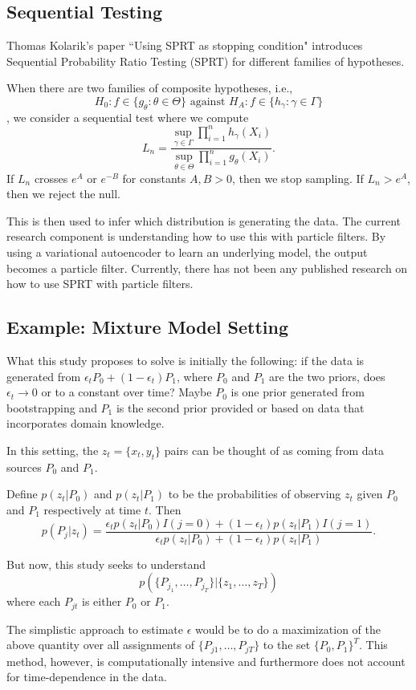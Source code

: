 \documentclass[english]{article}
\numberwithin{equation}{section}
\begin{document}
	\subsection*{Sequential Testing}
	Thomas Kolarik's paper ``Using SPRT as stopping condition" 
	\cite{url} introduces Sequential Probability Ratio Testing (SPRT) for different families of hypotheses.
	
	When there are two families of composite hypotheses, i.e.,
	$$H_0: f\in \{g_{\theta}:\theta\in \Theta\} \textrm{ against } H_A:f\in \{h_{\gamma}:\gamma\in \Gamma\}$$, we consider a sequential test where we compute $$L_n = \frac{\sup_{\gamma\in \Gamma} \prod_{i=1}^n h_{\gamma}(X_i)}{\sup_{\theta\in \Theta} \prod_{i=1}^n g_{\theta}(X_i)}.$$ If $L_n$ crosses $e^A$ or $e^{-B}$ for constants $A,B>0$, then we stop sampling. If $L_n>e^A$, then we reject the null.
	
	This is then used to infer which distribution is generating the data.  The current research component is understanding how to use this with particle filters. By using a variational autoencoder to learn an underlying model, the output becomes a particle filter. Currently, there has not been any published research on how to use SPRT with particle filters.
	
	\subsection*{Example: Mixture Model Setting}
	What this study proposes to solve is initially the following:
	if the data is generated from $\epsilon_t P_0 + (1-\epsilon_t) P_1$, where $P_0$ and $P_1$ are the two priors, does $\epsilon_t\to 0$ or to a constant over time? Maybe $P_0$ is one prior generated from bootstrapping and $P_1$ is the second prior provided or based on data that incorporates domain knowledge.
	
	In this setting, the $z_t=\{x_t,y_t\}$ pairs can be thought of as coming from data sources $P_0$ and $P_1$.
	
	Define $p(z_t|P_0)$ and $p(z_t|P_1)$ to be the probabilities of observing $z_t$ given $P_0$ and $P_1$ respectively at time $t$. Then $$p(P_j|z_t)=\frac{\epsilon_t p(z_t|P_0) I(j=0) + (1-\epsilon_t) p(z_t|P_1) I(j=1)}{\epsilon_t p(z_t|P_0) + (1-\epsilon_t) p(z_t|P_1)}.$$
	
	But now, this study seeks to understand
	$$p(\{P_{j_1},\ldots,P_{j_T}\}|\{z_1,\ldots,z_T\})$$ where each $P_{jt}$ is either $P_0$ or $P_1$.
	
	The simplistic approach to estimate $\epsilon$ would be to do a maximization of the above quantity over all assignments of $\{P_{j1},\ldots,P_{jT}\}$ to the set $\{P_0,P_1\}^T$. This method, however, is computationally intensive and furthermore does not account for time-dependence in the data.
	
\end{document}
